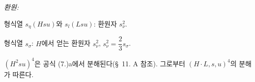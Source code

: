 
\noindent\emph{환원:}

형식열 $s_\eta(Hsu)$와 $s_l(Lsu)$: 환원자 $s_\nu^2$.

형식열 $s_\sigma$: $H$에서 얻는 환원자 $s_\nu^2$,
$s_\nu^2=\dfrac23s_\sigma$.

$(H^2su)^4$은 공식 (7.)a에서 분해된다(\S\ 11. A 참조). 그로부터 $(H\cdot L,s,u)^4$의 분해가 따른다.
